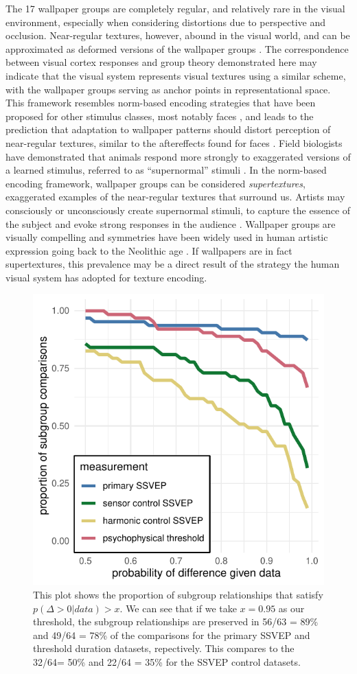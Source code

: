 \documentclass[11pt, twoside]{article}
\begin{document}
The 17 wallpaper groups are completely regular, and relatively rare in the visual environment, especially when considering distortions due to perspective and occlusion. Near-regular textures, however, abound in the visual world, and can be approximated as deformed versions of the wallpaper groups \cite{RN1519}. The correspondence between visual cortex responses and group theory demonstrated here may indicate that the visual system represents visual textures using a similar scheme, with the wallpaper groups serving as anchor points in representational space. This framework resembles norm-based encoding strategies that have been proposed for other stimulus classes, most notably faces \cite{RN435}, and leads to the prediction that adaptation to wallpaper patterns should distort perception of near-regular textures, similar to the aftereffects found for faces \cite{RN1768}. Field biologists have demonstrated that animals respond more strongly to exaggerated versions of a learned stimulus, referred to as “supernormal” stimuli \cite{RN1775}. In the norm-based encoding framework, wallpaper groups can be considered \textit{supertextures}, exaggerated examples of the near-regular textures that surround us. Artists may consciously or unconsciously create supernormal stimuli, to capture the essence of the subject and evoke strong responses in the audience \cite{RN1764}. Wallpaper groups are visually compelling and symmetries have been widely used in human artistic expression going back to the Neolithic age \cite{RN1949}. If wallpapers are in fact supertextures, this prevalence may be a direct result of the strategy the human visual system has adopted for texture encoding. 

\begin{figure}[tbp]
\centering
\includegraphics[width=0.5\linewidth]{../analysis/plots/model_roc_style.pdf}
\caption{This plot shows the proportion of subgroup relationships that satisfy $p(\Delta >0 | data) > x$. We can see that if we take $x = 0.95$ as our threshold, the subgroup relationships are preserved in 56/63 = 89\% and 49/64 = 78\% of the comparisons for the primary SSVEP and threshold duration datasets, repectively. This compares to the 32/64= 50\% and 22/64 = 35\% for the SSVEP control datasets.}
\label{fig:durations_rotations}
\end{figure}
\end{document}
